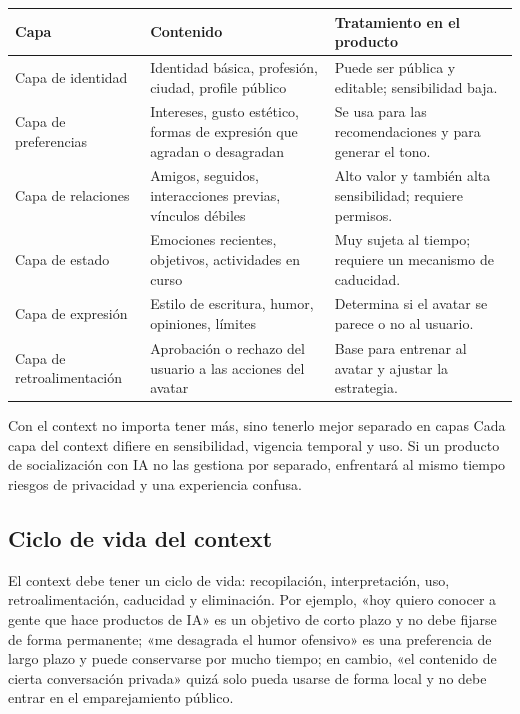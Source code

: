 \documentclass[a4paper]{article}
\begin{document}
\noindent\begin{longtable}{p{}p{}p{}}
\toprule
Capa & Contenido & Tratamiento en el producto \\
\midrule
Capa de identidad & Identidad básica, profesión, ciudad, profile público & Puede ser pública y editable; sensibilidad baja. \\
Capa de preferencias & Intereses, gusto estético, formas de expresión que agradan o desagradan & Se usa para las recomendaciones y para generar el tono. \\
Capa de relaciones & Amigos, seguidos, interacciones previas, vínculos débiles & Alto valor y también alta sensibilidad; requiere permisos. \\
Capa de estado & Emociones recientes, objetivos, actividades en curso & Muy sujeta al tiempo; requiere un mecanismo de caducidad. \\
Capa de expresión & Estilo de escritura, humor, opiniones, límites & Determina si el avatar se parece o no al usuario. \\
Capa de retroalimentación & Aprobación o rechazo del usuario a las acciones del avatar & Base para entrenar al avatar y ajustar la estrategia. \\
\bottomrule
\end{longtable}

\begin{importantbox}{Con el context no importa tener más, sino tenerlo mejor separado en capas}
Cada capa del context difiere en sensibilidad, vigencia temporal y uso. Si un producto de socialización con IA no las gestiona por separado, enfrentará al mismo tiempo riesgos de privacidad y una experiencia confusa.
\end{importantbox}

\subsection{Ciclo de vida del context}

El context debe tener un ciclo de vida: recopilación, interpretación, uso, retroalimentación, caducidad y eliminación. Por ejemplo, «hoy quiero conocer a gente que hace productos de IA» es un objetivo de corto plazo y no debe fijarse de forma permanente; «me desagrada el humor ofensivo» es una preferencia de largo plazo y puede conservarse por mucho tiempo; en cambio, «el contenido de cierta conversación privada» quizá solo pueda usarse de forma local y no debe entrar en el emparejamiento público.
\end{document}
